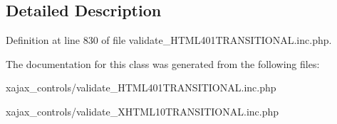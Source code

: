 \subsection{Detailed Description}


Definition at line 830 of file validate\_\-HTML401TRANSITIONAL.inc.php.



The documentation for this class was generated from the following files:\begin{DoxyCompactItemize}
\item 
xajax\_\-controls/validate\_\-HTML401TRANSITIONAL.inc.php\item 
xajax\_\-controls/validate\_\-XHTML10TRANSITIONAL.inc.php\end{DoxyCompactItemize}
